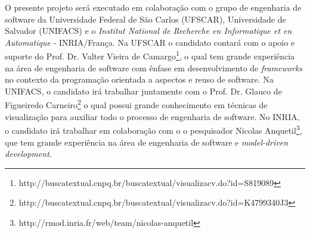 \documentclass[12pt]{article}
\begin{document}
O presente projeto será executado em colaboração com o grupo de engenharia de software da Universidade Federal de São Carlos (UFSCAR), Universidade de Salvador (UNIFACS) e o \textit{Institut National de Recherche en Informatique et en Automatique} - INRIA/França. Na UFSCAR o candidato contará com o apoio e suporte do Prof. Dr. Valter Vieira de Camargo\footnote{http://buscatextual.cnpq.br/buscatextual/visualizacv.do?id=S819089}, o qual tem grande experiência na área de engenharia de software com ênfase em desenvolvimento de \textit{frameworks} no contexto da programação orientada a aspectos e reuso de software. Na UNIFACS, o candidato irá trabalhar juntamente com o Prof. Dr. Glauco de Figueiredo Carneiro\footnote{http://buscatextual.cnpq.br/buscatextual/visualizacv.do?id=K4799340J3} o qual possui grande conhecimento em técnicas de visualização para auxiliar todo o processo de engenharia de software. No INRIA, o candidato irá trabalhar em colaboração com o o pesquisador Nicolas Anquetil\footnote{http://rmod.inria.fr/web/team/nicolas-anquetil}, que tem grande experiência na área de engenharia de software e \textit{model-driven development}.



\small


\end{document}
